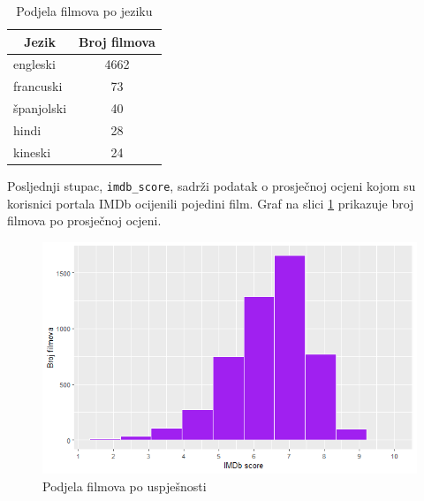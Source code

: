 	\begin{table}[H]
		\centering
		\renewcommand{\arraystretch}{1.5} %
		\begin{tabular}{|l|c|}
			\hline
			\multicolumn{1}{|c|}{\textbf{Jezik}} & \multicolumn{1}{c|}{\textbf{Broj filmova}} \\
			\hline
			engleski & 4662 \\
			\hline
			francuski & 73  \\
			\hline
			španjolski & 40  \\
			\hline
			hindi & 28  \\
			\hline
			kineski & 24 \\
			\hline
		\end{tabular}
		\caption{Podjela filmova po jeziku}
		\label{jezik}
	\end{table} 
	 
	 Posljednji stupac, \texttt{imdb\_score}, sadrži podatak o prosječnoj ocjeni kojom su korisnici portala IMDb ocijenili pojedini film. Graf na slici \ref{imdb} prikazuje broj filmova po prosječnoj ocjeni.
	 
	 \begin{figure}[H]
	 	\centering
	 	\includegraphics[width=15cm]{../figures/lucija_jednostavni/imdb.png}
	 	\caption{Podjela filmova po uspješnosti}
	 	\label{imdb}
	 \end{figure}
	
	 
	 
	 
	 
	 
	 
	 
	 
	\eject